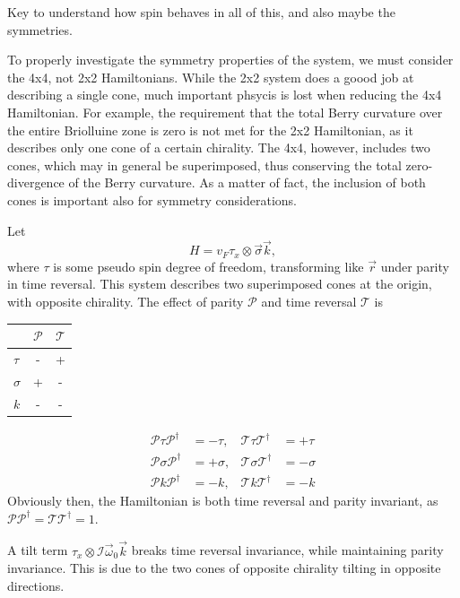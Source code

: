 Key to understand how spin behaves in all of this, and also maybe the symmetries.

To properly investigate the symmetry properties of the system, we must consider the 4x4, not 2x2 Hamiltonians.
While the 2x2 system does a goood job at describing a single cone, much important phsycis is lost when reducing the 4x4 Hamiltonian.
For example, the requirement that the total Berry curvature over the entire Briolluine zone is zero is not met for the 2x2 Hamiltonian, as it describes only one cone of a certain chirality.
The 4x4, however, includes two cones, which may in general be superimposed, thus conserving the total zero-divergence of the Berry curvature.
As a matter of fact, the inclusion of both cones is important also for symmetry considerations.

Let
\[
  H = v_{F} \tau _{x} \otimes \vec{\sigma} \vec{k},
\]
where \(\tau \) is some pseudo spin degree of freedom, transforming like \(\vec{r}\) under parity in time reversal.
This system describes two superimposed cones at the origin, with opposite chirality.
The effect of parity \(\mathcal{P}\) and time reversal \(\mathcal{T}\) is
\begin{table}[h]
  \centering
  \begin{tabular}{lcc}
    & \(\mathcal{P}\) & \(\mathcal{T}\)\\
    \hline
    \(\tau \) & - & +\\
    \(\sigma \) & + & -\\
    \(k\) & - & -
  \end{tabular}
\end{table}
\begin{equation}
  \label{eq:26}
  \begin{aligned}
    \mathcal{P} \tau \mathcal{P}^{\dagger} &= -\tau, & \mathcal{T} \tau \mathcal{T}^{\dagger} &= +\tau\\
    \mathcal{P} \sigma  \mathcal{P}^{\dagger} &= + \sigma,  & \mathcal{T} \sigma  \mathcal{T}^{\dagger} &= -\sigma \\
    \mathcal{P} k \mathcal{P}^{\dagger} &= -k, & \mathcal{T} k \mathcal{T}^{\dagger} &= -k
  \end{aligned}
\end{equation}
Obviously then, the Hamiltonian is both time reversal and parity invariant, as \(\mathcal{P} \mathcal{P}^{\dagger} = \mathcal{T} \mathcal{T}^{\dagger} = 1\).

A tilt term \(\tau _{x} \otimes \mathcal{I} \vec{\omega} _{0} \vec{k}\) breaks time reversal invariance, while maintaining parity invariance.
This is due to the two cones of opposite chirality tilting in opposite directions.

